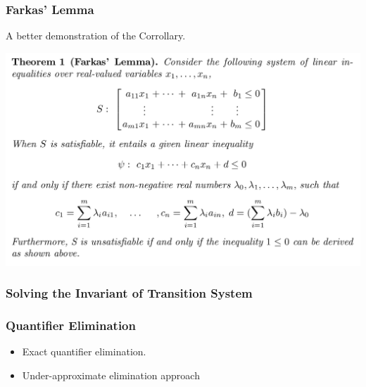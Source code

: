 \documentclass[11pt]{beamer}
\begin{document}
\begin{frame}\frametitle{Farkas' Lemma}
A better demonstration of the Corrollary.
\begin{center}
\includegraphics[scale=0.25]{fc.png}
\end{center}

\end{frame}

\begin{frame}\frametitle{Solving the Invariant of Transition System}

\end{frame}

\begin{frame}\frametitle{Quantifier Elimination}
\begin{itemize}
\item Exact quantifier elimination.

\item Under-approximate elimination approach			
\end{itemize}
\end{frame}
\end{document}
